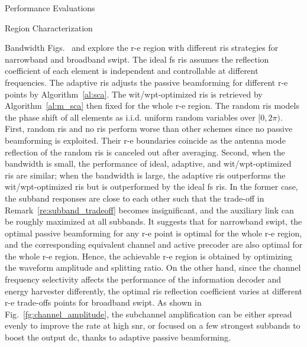 \begin{section}{Performance Evaluations}
\begin{subsection}{ Region Characterization}
\begin{subsubsection}{Bandwidth}
			Figs.~ and  explore the \gls{r-e} region with different \gls{ris} strategies for narrowband and broadband \gls{swipt}. The ideal \gls{fs} \gls{ris} assumes the reflection coefficient of each element is independent and controllable at different frequencies. The adaptive \gls{ris} adjusts the passive beamforming for different \gls{r-e} points by Algorithm~\ref{al:sca}. The \gls{wit}/\gls{wpt}-optimized \gls{ris} is retrieved by Algorithm~\ref{al:m_sca} then fixed for the whole \gls{r-e} region. The random \gls{ris} models the phase shift of all elements as i.i.d. uniform random variables over $[0, 2\pi)$. First, random \gls{ris} and no \gls{ris} perform worse than other schemes since no passive beamforming is exploited. Their \gls{r-e} boundaries coincide as the antenna mode reflection of the random \gls{ris} is canceled out after averaging. Second, when the bandwidth is small, the performance of ideal, adaptive, and \gls{wit}/\gls{wpt}-optimized \gls{ris} are similar; when the bandwidth is large, the adaptive \gls{ris} outperforms the \gls{wit}/\gls{wpt}-optimized \gls{ris} but is outperformed by the ideal \gls{fs} \gls{ris}. In the former case, the subband responses are close to each other such that the trade-off in Remark~\ref{re:subband_tradeoff} becomes insignificant, and the auxiliary link can be roughly maximized at all subbands. It suggests that for narrowband \gls{swipt}, the optimal passive beamforming for any \gls{r-e} point is optimal for the whole \gls{r-e} region, and the corresponding equivalent channel and active precoder are also optimal for the whole \gls{r-e} region. Hence, the achievable \gls{r-e} region is obtained by optimizing the waveform amplitude and splitting ratio. On the other hand, since the channel frequency selectivity affects the performance of the information decoder and energy harvester differently, the optimal \gls{ris} reflection coefficient varies at different \gls{r-e} trade-offs points for broadband \gls{swipt}. As shown in Fig.~\ref{fg:channel_amplitude}, the subchannel amplification can be either spread evenly to improve the rate at high \gls{snr}, or focused on a few strongest subbands to boost the output \gls{dc}, thanks to adaptive passive beamforming.
		\end{subsubsection}


\end{subsection}
\end{section}
